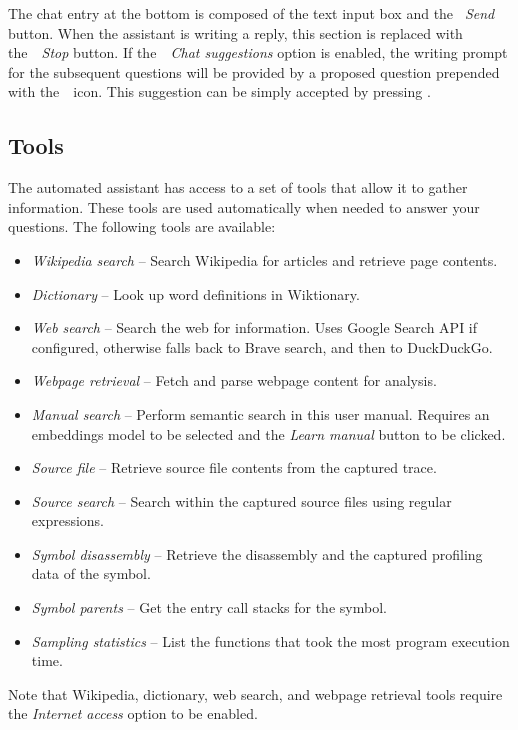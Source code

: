 \documentclass[hidelinks,titlepage,a4paper,twoside]{article}
\begin{document}
The chat entry at the bottom is composed of the text input box and the \emph{\faPaperPlane{}~Send} button. When the assistant is writing a reply, this section is replaced with the~\emph{\faStop{}~Stop} button. If the~\emph{\faCommentDots{}~Chat suggestions} option is enabled, the writing prompt for the subsequent questions will be provided by a proposed question prepended with the~\faCommentDots{}~icon. This suggestion can be simply accepted by pressing .

\subsection{Tools}

The automated assistant has access to a set of tools that allow it to gather information. These tools are used automatically when needed to answer your questions. The following tools are available:

\begin{itemize}
\item \emph{Wikipedia search} -- Search Wikipedia for articles and retrieve page contents.
\item \emph{Dictionary} -- Look up word definitions in Wiktionary.
\item \emph{Web search} -- Search the web for information. Uses Google Search API if configured, otherwise falls back to Brave search, and then to DuckDuckGo.
\item \emph{Webpage retrieval} -- Fetch and parse webpage content for analysis.
\item \emph{Manual search} -- Perform semantic search in this user manual. Requires an embeddings model to be selected and the \emph{Learn manual} button to be clicked.
\item \emph{Source file} -- Retrieve source file contents from the captured trace.
\item \emph{Source search} -- Search within the captured source files using regular expressions.
\item \emph{Symbol disassembly} -- Retrieve the disassembly and the captured profiling data of the symbol.
\item \emph{Symbol parents} -- Get the entry call stacks for the symbol.
\item \emph{Sampling statistics} -- List the functions that took the most program execution time.
\end{itemize}

Note that Wikipedia, dictionary, web search, and webpage retrieval tools require the \emph{Internet access} option to be enabled.
\end{document}
